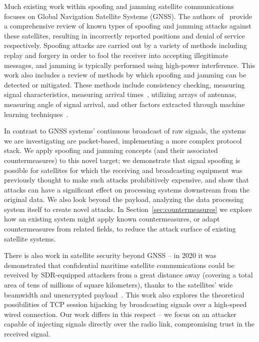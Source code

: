 Much existing work within spoofing and jamming satellite communications focuses on Global Navigation Satellite Systems (GNSS).
The authors of~\cite{wuSpoofing2020} provide a comprehensive review of known types of spoofing and jamming attacks against these satellites, resulting in incorrectly reported positions and denial of service respectively.
Spoofing attacks are carried out by a variety of methods including replay and forgery in order to fool the receiver into accepting illegitimate messages, and jamming is typically performed using high-power interference.
This work also includes a review of methods by which spoofing and jamming can be detected or mitigated.
These methods include consistency checking, measuring signal characteristics, measuring arrival times~\cite{jedermann2021orbit}, utilizing arrays of antennas, measuring angle of signal arrival, and other factors extracted through machine learning techniques~\cite{oligeri2020past}.

In contrast to GNSS systems' continuous broadcast of raw signals, the systems we are investigating are packet-based, implementing a more complex protocol stack.
We apply spoofing and jamming concepts (and their associated countermeasures) to this novel target; we demonstrate that signal spoofing is possible for satellites for which the receiving and broadcasting equipment was previously thought to make such attacks prohibitively expensive, and show that attacks can have a significant effect on processing systems downstream from the original data.
We also look beyond the payload, analyzing the data processing system itself to create novel attacks.
In Section~\ref{sec:countermeasures} we explore how an existing system might apply known countermeasures, or adapt countermeasures from related fields, to reduce the attack surface of existing satellite systems.

There is also work in satellite security beyond GNSS -- in 2020 it was demonstrated that confidential maritime satellite communications could be reveived by SDR-equipped attackers from a great distance away (covering a total area of tens of millions of square kilometers), thanks to the satellites' wide beamwidth and unencrypted payload~\cite{pavurTale2020}.
This work also explores the theoretical possibilities of TCP session hijacking by broadcasting signals over a high-speed wired connection.
Our work differs in this respect -- we focus on an attacker capable of injecting signals directly over the radio link, compromising trust in the received signal.

